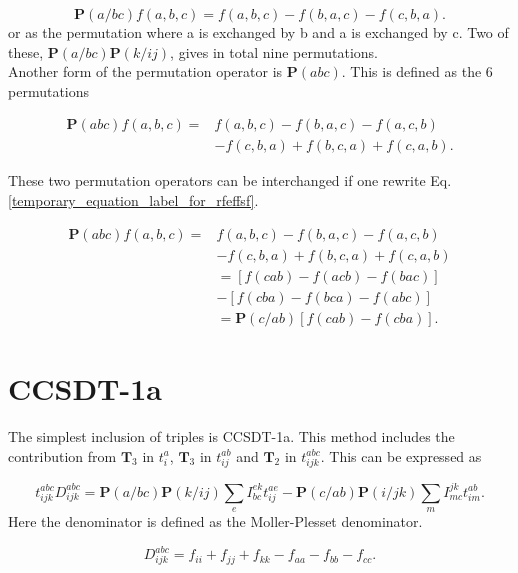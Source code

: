 \begin{equation}
\textbf{P}(a/bc) f(a,b,c) = f(a,b,c) - f(b,a,c) - f(c,b,a) .
\end{equation}
or as the permutation where a is exchanged by b and a is exchanged by c. Two of these,  $\textbf{P}(a/bc) \textbf{P}(k/ij)$, gives in total nine permutations. \\

Another form of the permutation operator is $\textbf{P}(abc)$. This is defined as the 6 permutations

\begin{align}
\textbf{P}(abc) f(a,b,c) = & f(a,b,c) - f(b,a,c) - f(a,c,b)  \nonumber \\ & - f(c,b,a) + f(b,c,a) + f(c,a,b) . \label{temporary_equation_label_for_rfeffsf}
\end{align}

These two permutation operators can be interchanged if one rewrite Eq. \eqref{temporary_equation_label_for_rfeffsf}. 

\begin{align}
\textbf{P}(abc) f(a,b,c) = & f(a,b,c) - f(b,a,c) - f(a,c,b)  \nonumber \\ & - f(c,b,a) + f(b,c,a) + f(c,a,b) \nonumber \\ &
= \left[ f(cab) - f(acb) - f(bac) \right] \nonumber \\ &
- \left[ f(cba) - f(bca) - f(abc) \right]
\nonumber \\ &
= \textbf{P}(c/ab) \left[ f(cab) - f(cba) \right] .
\end{align}

\section{CCSDT-1a}
The simplest inclusion of triples is CCSDT-1a. This method includes the contribution from $\textbf{T}_3$ in $t_i^a$, $\textbf{T}_3$ in $t_{ij}^{ab}$ and $\textbf{T}_2$ in $t_{ijk}^{abc}$. This can be expressed as

\begin{equation}
t_{ijk}^{abc} D_{ijk}^{abc} = 
\textbf{P}(a/bc) \textbf{P}(k/ij) \sum_e I_{bc}^{ek} t_{ij}^{ae}
- \textbf{P}(c/ab) \textbf{P}(i/jk) \sum_m I_{mc}^{jk} t_{im}^{ab} .
\end{equation}
Here the denominator is defined as the Moller-Plesset denominator. 

\begin{equation}
D_{ijk}^{abc} = f_{ii} + f_{jj} + f_{kk} - f_{aa} - f_{bb} - f_{cc} .
\end{equation}

